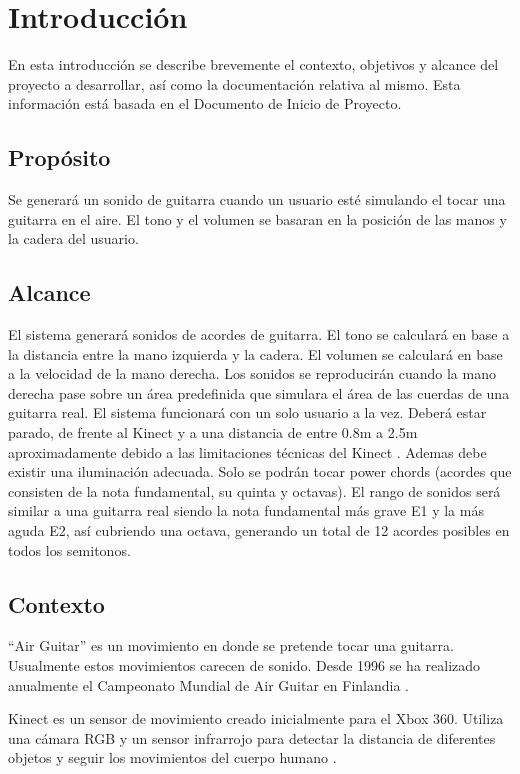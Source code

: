 \documentclass[a4paper,12pt]{article}
\begin{document}
\listoftables

\listoffigures
\newpage

\section{Introducción}
En esta introducción se describe brevemente el contexto, objetivos y alcance
del proyecto a desarrollar, así como la documentación relativa al mismo. Esta
información está basada en el Documento de Inicio de Proyecto.

\subsection{Propósito}
Se generará un sonido de guitarra cuando un usuario esté simulando el tocar
una guitarra en el aire. El tono y el volumen se basaran en la posición de
las manos y la cadera del usuario.

\subsection{Alcance}
El sistema generará sonidos de acordes de guitarra. El tono se calculará en
base a la distancia entre la mano izquierda y la cadera. El volumen se
calculará en base a la velocidad de la mano derecha. Los sonidos se
reproducirán cuando la mano derecha pase sobre un área predefinida que
simulara el área de las cuerdas de una guitarra real.  El sistema funcionará
con un solo usuario a la vez. Deberá estar parado, de frente al Kinect y a
una distancia de entre 0.8m  a 2.5m aproximadamente debido a las limitaciones
técnicas del Kinect \cite{depth_range}. Ademas debe existir una iluminación adecuada. Solo se
podrán tocar power chords (acordes que consisten de la nota fundamental, su
quinta y octavas). El rango de sonidos será similar a una guitarra real
siendo la nota fundamental más grave E1 y la más aguda E2, así cubriendo una
octava, generando un total de 12 acordes posibles en todos los semitonos. 

\subsection{Contexto}
“Air Guitar” es un movimiento en donde se pretende tocar una guitarra.
Usualmente estos movimientos carecen de sonido. Desde 1996 se ha realizado
anualmente el Campeonato Mundial de Air Guitar en Finlandia \cite{air_guitar}.

Kinect es un sensor de movimiento creado inicialmente para el Xbox 360.
Utiliza una cámara RGB y un sensor infrarrojo para detectar la distancia de
diferentes objetos y seguir los movimientos del cuerpo humano \cite{kinect_spec}.
\end{document}
